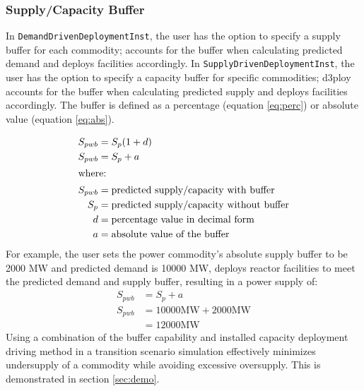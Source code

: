     \subsubsection{\textbf{Supply/Capacity Buffer}}
    In \texttt{DemandDrivenDeploymentInst}, the user has the option to specify a 
    supply buffer for each commodity; \deploy accounts for the buffer when 
    calculating predicted demand and deploys facilities accordingly.
    In \texttt{SupplyDrivenDeploymentInst},
    the user has the option to specify a capacity buffer for specific 
    commodities; d3ploy accounts for the buffer when calculating predicted 
    supply and deploys facilities accordingly. 
    The buffer is defined as a percentage (equation \ref{eq:perc}) 
    or absolute value (equation \ref{eq:abs}). 
    
    \begin{align}
        \label{eq:perc}
        S_{pwb} &= S_{p}(1+d)\\
        \label{eq:abs}
        S_{pwb} &= S_{p}+a \\
        \intertext{where:}
        S_{pwb} &= \mbox{predicted supply/capacity with buffer} \nonumber\\
        S_p &= \mbox{predicted supply/capacity without buffer} \nonumber\\
        d &= \mbox{percentage value in decimal form} \nonumber\\
        a &= \mbox{absolute value of the buffer} \nonumber
    \end{align}
    For example, the user sets the power commodity's absolute supply buffer 
    to be 2000 MW and predicted demand is 10000 MW, \deploy deploys reactor 
    facilities to meet the predicted demand and supply buffer, resulting 
    in a power supply of: 
    \begin{align*}
        S_{pwb} &= S_{p}+a \\
        S_{pwb} &= 10000 \mbox{MW}+2000 \mbox{MW} \\
        &= 12000\mbox{MW}
    \end{align*}
    Using a combination of the buffer capability and  
    installed capacity deployment driving method in a transition 
    scenario simulation effectively minimizes undersupply of a 
    commodity while avoiding excessive oversupply. 
    This is demonstrated in section \ref{sec:demo}. 
    
